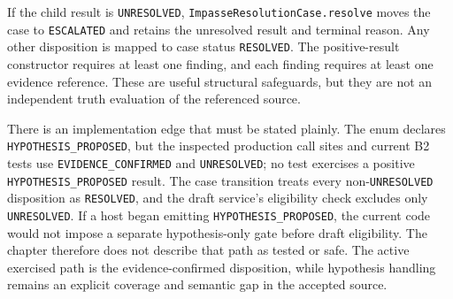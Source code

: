 If the child result is \texttt{UNRESOLVED}, \texttt{Impasse\allowbreak Resolution\allowbreak Case.\allowbreak resolve} moves the case to \texttt{ESCALATED} and retains the unresolved result and terminal reason. Any other disposition is mapped to case status \texttt{RESOLVED}. The positive-result constructor requires at least one finding, and each finding requires at least one evidence reference. These are useful structural safeguards, but they are not an independent truth evaluation of the referenced source.

There is an implementation edge that must be stated plainly. The enum declares \texttt{HYPOTHESIS\_\allowbreak PROPOSED}, but the inspected production call sites and current B2 tests use \texttt{EVIDENCE\_\allowbreak CONFIRMED} and \texttt{UNRESOLVED}; no test exercises a positive \texttt{HYPOTHESIS\_\allowbreak PROPOSED} result. The case transition treats every non-\texttt{UNRESOLVED} disposition as \texttt{RESOLVED}, and the draft service's eligibility check excludes only \texttt{UNRESOLVED}. If a host began emitting \texttt{HYPOTHESIS\_\allowbreak PROPOSED}, the current code would not impose a separate hypothesis-only gate before draft eligibility. The chapter therefore does not describe that path as tested or safe. The active exercised path is the evidence-confirmed disposition, while hypothesis handling remains an explicit coverage and semantic gap in the accepted source.

